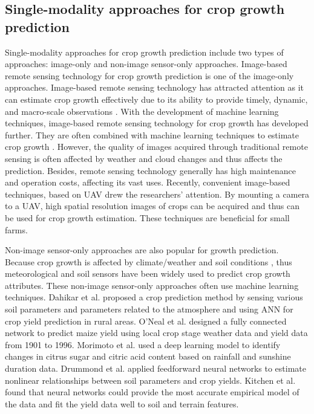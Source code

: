 \documentclass[acmsmall,manuscript, screen, review]{acmart}
\begin{document}
\subsection{Single-modality approaches for crop growth prediction}
Single-modality approaches for crop growth prediction include two types of approaches: image-only and non-image sensor-only approaches. Image-based remote sensing technology for crop growth prediction is one of the image-only approaches. Image-based remote sensing technology has attracted attention as it can estimate crop growth effectively due to its ability to provide timely, dynamic, and macro-scale observations \cite{__2016}. With the development of machine learning techniques, image-based remote sensing technology for crop growth has developed further. They are often combined with machine learning techniques to estimate crop growth \cite{johnson_crop_2016,zhong_deep_2019,yang_deep_2019}. However, the quality of images acquired through traditional remote sensing is often affected by weather and cloud changes and thus affects the prediction. Besides, remote sensing technology generally has high maintenance and operation costs, affecting its vast uses. Recently, convenient image-based techniques, based on UAV drew the researchers’ attention\cite{weiss_plant_2011,tao_estimation_2020,zhou_predicting_2017,maimaitijiang_unmanned_2017,wan_grain_2020}. By mounting a camera to a UAV, high spatial resolution images of crops can be acquired and thus can be used for crop growth estimation. These techniques are beneficial for small farms. 

Non-image sensor-only approaches are also popular for growth prediction. Because crop growth is affected by climate/weather and soil conditions \cite{fortin_site-specific_2011,campbell_effect_1988,ehret_neural_2011}, thus meteorological and soil sensors have been widely used to predict crop growth attributes. These non-image sensor-only approaches often use machine learning techniques. Dahikar et al. \cite{dahikar_agricultural_2014} proposed a crop prediction method by sensing various soil parameters and parameters related to the atmosphere and using ANN for crop yield prediction in rural areas. O'Neal et al. \cite{oneal_neural_2002} designed a fully connected network to predict maize yield using local crop stage weather data and yield data from 1901 to 1996. Morimoto et al. \cite{morimoto_dynamic_2007} used a deep learning model to identify changes in citrus sugar and citric acid content based on rainfall and sunshine duration data. Drummond et al. \cite{drummond_application_1998} applied feedforward neural networks to estimate nonlinear relationships between soil parameters and crop yields. Kitchen et al. \cite{kitchen_soil_2003} found that neural networks could provide the most accurate empirical model of the data and fit the yield data well to soil and terrain features.
\end{document}
